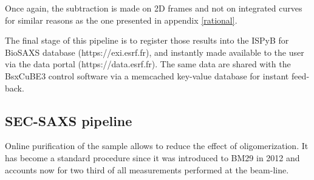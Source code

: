 \documentclass[preprint]{iucr}              %
\begin{document}
Once again, the subtraction is made on 2D frames and not on integrated curves for similar reasons as the one presented in appendix \ref{rational}.



The final stage of this pipeline is to register those results into the ISPyB for BioSAXS database \cite{ISPYBB} (https://exi.esrf.fr), and instantly made available to the user via the data portal (https://data.esrf.fr). 
The same data are shared with the BsxCuBE3 control software via a memcached key-value database for instant feed-back.

\subsection{SEC-SAXS pipeline}
Online purification of the sample allows to reduce the effect of oligomerization.
It has become a standard procedure since it was introduced to BM29 in 2012 \cite{SECPaper2012} and accounts now for two third of all measurements performed at the beam-line.
\end{document}

